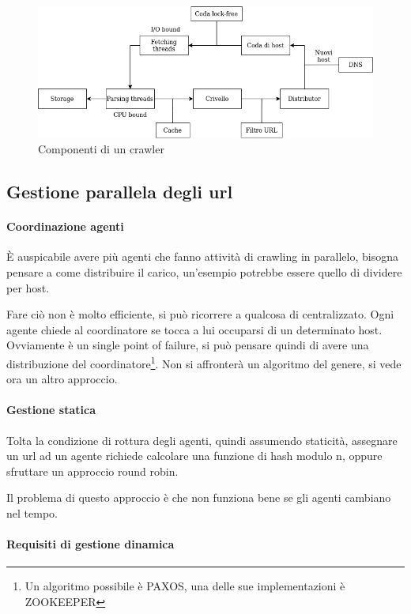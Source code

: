 \begin{figure}[h]
    \includegraphics[width=\textwidth]{images/crawling}
    \caption{Componenti di un crawler}
\end{figure}

\subsection{Gestione parallela degli url}

\paragraph{Coordinazione agenti}
È auspicabile avere più agenti che fanno attività di crawling in parallelo, 
bisogna pensare a come distribuire il carico, un'esempio potrebbe essere quello di 
dividere per host.

Fare ciò non è molto efficiente, si può ricorrere a qualcosa di centralizzato.
Ogni agente chiede al coordinatore se tocca a lui occuparsi di un determinato host. 
Ovviamente è un single point of failure, si può pensare quindi di avere una distribuzione
del coordinatore\footnote{Un algoritmo possibile è PAXOS, una delle sue implementazioni 
è ZOOKEEPER}. Non si affronterà un algoritmo del genere, si vede ora un altro approccio.

\paragraph{Gestione statica}
Tolta la condizione di rottura degli agenti, quindi assumendo staticità, assegnare 
un url ad un agente richiede calcolare una funzione di hash modulo n, oppure 
sfruttare un approccio round robin. 

Il problema di questo approccio è che non funziona bene se gli agenti cambiano nel tempo.

\paragraph{Requisiti di gestione dinamica}

